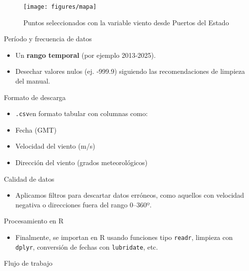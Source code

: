 \documentclass[
]{article}
\providecommand{\tightlist}{%
  \setlength{\itemsep}{0pt}\setlength{\parskip}{0pt}}
\begin{document}
\begin{figure}

{\centering \texttt{[image: figures/mapa]} 

}

\caption{Puntos seleccionados con la variable viento desde Puertos del Estado}\label{fig:mapa}
\end{figure}

Período y frecuencia de datos

\begin{itemize}
\tightlist
\item
  Un \textbf{rango temporal} (por ejemplo 2013‑2025).
\item
  Desechar valores nulos (ej. ‑999.9) siguiendo las recomendaciones de limpieza del manual.
\end{itemize}

Formato de descarga

\begin{itemize}
\tightlist
\item
  \texttt{.csv}en formato tabular con columnas como:
\item
  Fecha (GMT)
\item
  Velocidad del viento (m/s)
\item
  Dirección del viento (grados meteorológicos)
\end{itemize}

Calidad de datos

\begin{itemize}
\tightlist
\item
  Aplicamos filtros para descartar datos erróneos, como aquellos con velocidad negativa o direcciones fuera del rango 0--360º.
\end{itemize}

Procesamiento en R

\begin{itemize}
\tightlist
\item
  Finalmente, se importan en R usando funciones tipo \texttt{readr}, limpieza con \texttt{dplyr}, conversión de fechas con \texttt{lubridate}, etc.
\end{itemize}

Flujo de trabajo
\end{document}
